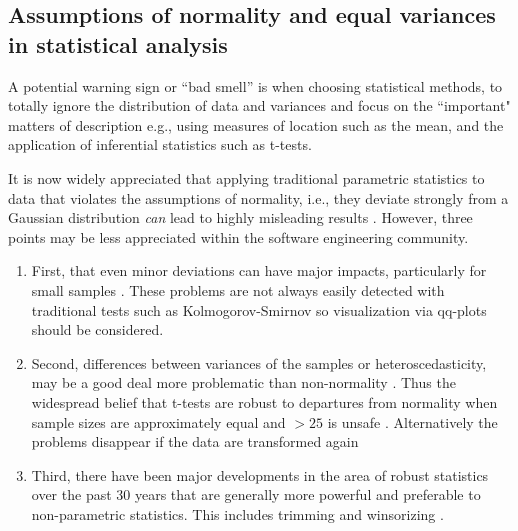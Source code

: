 \documentclass[preprint,10pt]{elsarticle}
\begin{document}




\subsection{Assumptions of normality and equal variances in statistical analysis}

A potential warning sign or ``bad smell'' is when choosing statistical methods, to totally ignore the distribution of data and variances and focus on the ``important" matters of description e.g., using measures of location such as the mean, and the application of inferential statistics such as t-tests.

It is now widely appreciated that applying traditional parametric statistics to data that violates the assumptions of normality, i.e., they deviate strongly from a Gaussian distribution \textit{can} lead to highly misleading results \cite{Kitc02}.  However, three points may be less appreciated within the software engineering community. 
\begin{enumerate}
    \item First, that even minor deviations can have major impacts, particularly for small samples \cite{Wilc12}.  These problems are not always easily detected with traditional tests such as Kolmogorov-Smirnov so visualization via qq-plots should be considered.
\item Second, differences between variances of the samples or heteroscedasticity, may be a good deal more problematic than non-normality \cite{Erce08}. Thus the widespread belief that t-tests are robust to departures from normality when sample sizes are approximately equal and $>25$ is unsafe \cite{Erce08,Zimm98}.  Alternatively the problems disappear if the data are transformed again 
\item Third, there have been major developments in the area of robust statistics over the past 30 years that are generally more powerful and preferable to non-parametric statistics.  This includes trimming and winsorizing \cite{Hoag83,Kitc17}.
\end{enumerate}
\end{document}
